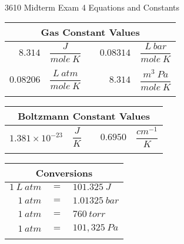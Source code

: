 \documentclass[12pt, letterpaper]{memoir}
\begin{document}
\newpage
\pagestyle{empty}

~
\vspace{-3em}
\begin{center}
	{\LARGE 3610 Midterm Exam 4 Equations and Constants}
\end{center}

\vspace{-1em}\noindent
\begin{minipage}{0.57\linewidth}
	\begin{mdframed}
		\begin{tabular}{rlcrl}
			\multicolumn{5}{c}{Gas Constant Values}                                       \\ \midrule
			$8.314$   & $\dfrac{J}{mole~K}$     &  & $0.08314$ & $\dfrac{L~bar}{mole~K}$  \\ \\
			$0.08206$ & $\dfrac{L~atm}{mole~K}$ &  & $8.314$   & $\dfrac{m^3~Pa}{mole~K}$ \\ \\
		\end{tabular}
		\begin{tabular}{rlcrl}
			\multicolumn{5}{c}{Boltzmann Constant Values}                                 \\ \midrule
			$1.381 \times 10^{-23}$ & $\dfrac{J}{K}$ &  & $0.6950$ & $\dfrac{cm^{-1}}{K}$ \\ \\
		\end{tabular}
	\end{mdframed}
\end{minipage}
\hspace{20pt}
\begin{minipage}{0.4\linewidth}
	\begin{mdframed}
		\begin{tabular}{rcl}
			\multicolumn{3}{c}{Conversions}  \\ \midrule
			$1~L~atm $ & $=$ & $101.325~J$   \\ \\
			$1~atm $   & $=$ & $1.01325~bar$ \\ \\
			$1~atm $   & $=$ & $760~torr$    \\ \\
			$1~atm $   & $=$ & $101,325~Pa$  \\ \\
		\end{tabular}
	\end{mdframed}
\end{minipage}
\end{document}
